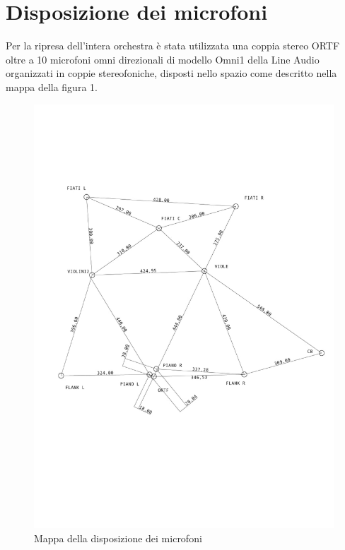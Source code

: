 \newcommand{\mylanguages}{italian} %
\newcommand{\mytitle}{Totalità sonora: il corpo dell'orchestra}
\newcommand{\mysubtitle}{Per ascoltare l'organismo sonoro orchestrale nel suo complesso e nei singoli dettagli}
\newcommand{\authorone}{Giancarlo Bottalico}
\newcommand{\institutione}{Conservatorio di musica "N. Piccinni", Bari}
\newcommand{\emailone}{giancarlobottalico@gmail.com}


\maketitle
\thispagestyle{empty}
\section*{Disposizione dei microfoni}
Per la ripresa dell'intera orchestra è stata utilizzata una coppia stereo ORTF oltre a  10 microfoni omni direzionali di modello Omni1 della Line Audio organizzati in coppie stereofoniche, disposti nello spazio come descritto nella mappa della figura 1.

\begin{figure}[t]
	\centering
	\includegraphics[width=.47\textwidth]{img/image2.jpg}
	\caption{Mappa della disposizione dei microfoni}
	\label{gs}
\end{figure}

